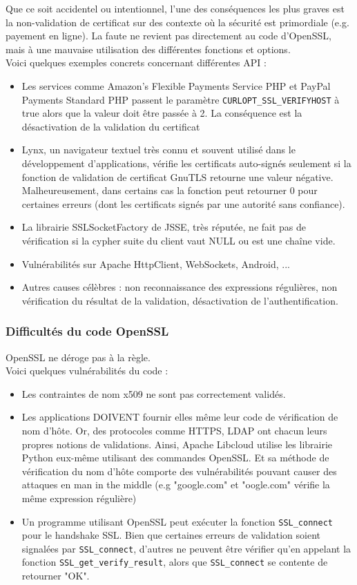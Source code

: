 Que ce soit accidentel ou intentionnel, l'une des conséquences les plus graves est la non-validation de certificat sur des contexte où la sécurité est primordiale (e.g. payement en ligne). La faute ne revient pas directement au code d'OpenSSL, mais à une mauvaise utilisation des différentes fonctions et options.\\


Voici quelques exemples concrets concernant différentes API :
\begin{itemize}
\item Les services comme Amazon's Flexible Payments Service PHP et PayPal Payments Standard PHP passent le paramètre \texttt{CURLOPT\_SSL\_VERIFYHOST} à true alors que la valeur doit être passée à 2. La conséquence est la désactivation de la validation du certificat
\item Lynx, un navigateur textuel très connu et souvent utilisé dans le développement d'applications, vérifie les certificats auto-signés seulement si la fonction de validation de certificat GnuTLS retourne une valeur négative. Malheureusement, dans certains cas la fonction peut retourner 0 pour certaines erreurs (dont les certificats signés par une autorité sans confiance).
\item La librairie SSLSocketFactory de JSSE, très réputée, ne fait pas de vérification si la cypher suite du client vaut NULL ou est une chaîne vide.
\item Vulnérabilités sur Apache HttpClient, WebSockets, Android, ...
\item Autres causes célèbres : non reconnaissance des expressions régulières, non vérification du résultat de la validation, désactivation de l'authentification.\\
\end{itemize}


\subsubsection{Difficultés du code OpenSSL}


OpenSSL ne déroge pas à la règle.\\
Voici quelques vulnérabilités du code :
\begin{itemize}
\item Les contraintes de nom x509 ne sont pas correctement validés.
\item Les applications DOIVENT fournir elles même leur code de vérification de nom d'hôte. Or, des protocoles comme HTTPS, LDAP ont chacun leurs propres notions de validations. Ainsi, Apache Libcloud utilise les librairie Python eux-même utilisant des commandes OpenSSL. Et sa méthode de vérification du nom d'hôte comporte des vulnérabilités pouvant causer des attaques en man in the middle (e.g "google.com" et "oogle.com" vérifie la même expression régulière)
\item Un programme utilisant OpenSSL peut exécuter la fonction \texttt{SSL\_connect} pour le handshake SSL. Bien que certaines erreurs de validation soient signalées par \texttt{SSL\_connect}, d'autres ne peuvent être vérifier qu'en appelant la fonction \texttt{SSL\_get\_verify\_result}, alors que \texttt{SSL\_connect} se contente de retourner "OK".
\end{itemize}


